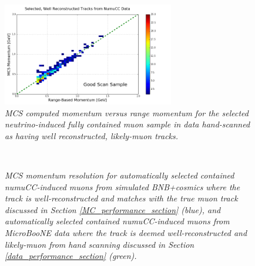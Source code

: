 \begin{figure}
\centering
	\includegraphics[width=75mm]{Figures/MCS_range_momentum_DataRecoTracks_goodhandscan.png}
\caption{\textit{MCS computed momentum versus range momentum for the selected neutrino-induced fully contained muon sample in data hand-scanned as having well reconstructed, likely-muon tracks.}}
\label{pub_plot_4}
\end{figure}



\begin{figure}
\centering
\mbox{
	\quad
	}
\caption{\textit{MCS momentum resolution for automatically selected contained numuCC-induced muons from simulated BNB+cosmics where the track is well-reconstructed and matches with the true muon track discussed in Section \ref{MC_performance_section} (blue), and automatically selected contained numuCC-induced muons from MicroBooNE data where the track is deemed well-reconstructed and likely-muon from hand scanning discussed in Section \ref{data_performance_section} (green).}}\label{pub_plot_5}
\end{figure}



